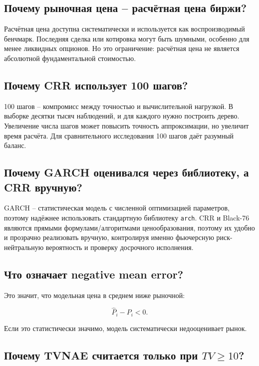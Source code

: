\documentclass[11pt,a4paper]{article}
\begin{document}
\subsection*{Почему рыночная цена -- расчётная цена биржи?}

Расчётная цена доступна систематически и используется как воспроизводимый бенчмарк. Последняя сделка или котировка могут быть шумными, особенно для менее ликвидных опционов. Но это ограничение: расчётная цена не является абсолютной фундаментальной стоимостью.

\subsection*{Почему CRR использует 100 шагов?}

100 шагов -- компромисс между точностью и вычислительной нагрузкой. В выборке десятки тысяч наблюдений, и для каждого нужно построить дерево. Увеличение числа шагов может повысить точность аппроксимации, но увеличит время расчёта. Для сравнительного исследования 100 шагов даёт разумный баланс.

\subsection*{Почему GARCH оценивался через библиотеку, а CRR вручную?}

GARCH -- статистическая модель с численной оптимизацией параметров, поэтому надёжнее использовать стандартную библиотеку \texttt{arch}. CRR и Black-76 являются прямыми формулами/алгоритмами ценообразования, поэтому их удобно и прозрачно реализовать вручную, контролируя именно фьючерсную риск-нейтральную вероятность и проверку досрочного исполнения.

\subsection*{Что означает negative mean error?}

Это значит, что модельная цена в среднем ниже рыночной:

\begin{equation}
\widehat{P}_i-P_i<0.
\end{equation}

Если это статистически значимо, модель систематически недооценивает рынок.

\subsection*{Почему TVNAE считается только при $TV\geq10$?}
\end{document}
